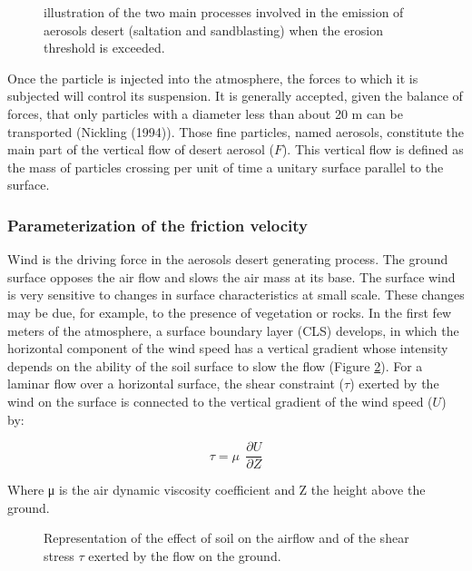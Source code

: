 \begin{figure}[h]
\begin{center}
\caption{illustration of the two main processes involved in the emission of aerosols desert (saltation and sandblasting) when the
erosion threshold is exceeded. \label{fig_chap5_1}}
\end{center}
\end{figure}

Once the particle is injected into the atmosphere, the forces to which it is subjected will
control its suspension. It is generally accepted, given the balance of forces, that only
particles with a diameter less than about 20 \textmu m can be transported (Nickling (1994)\nocite{Nickling1974}). 
Those fine particles, named aerosols, constitute the main part of the vertical flow of
desert aerosol ($F$). This vertical flow is defined as the mass of particles crossing per unit of time
a unitary surface parallel to the surface.

\subsubsection{Parameterization of the friction velocity}
Wind is the driving force in the aerosols desert generating process. The
ground surface opposes the air flow and slows the air mass at its base. The surface wind
is very sensitive to changes in surface characteristics at small
scale. These changes may be due, for example, to the presence of vegetation or
rocks. In the first few meters of the atmosphere, a surface boundary layer (CLS)
develops, in which the horizontal component of the wind speed has a
vertical gradient whose intensity depends on the ability of the soil surface to slow the
flow (Figure \ref{fig_chap5_2}). For a laminar flow over a horizontal surface, the
shear constraint ($\tau$) exerted by the wind on the surface is connected to the vertical gradient
of the wind speed ($U$) by:

\begin{equation}
\tau = \mu~~\frac{\partial U}{\partial Z}
\end{equation}
	
Where μ is the air dynamic viscosity coefficient and Z the height above the ground.

\begin{figure}[h]
\begin{center}
\caption{Representation of the effect of soil on the airflow and of the shear stress $\tau$ 
exerted by the flow on the ground. \label{fig_chap5_2}}
\end{center}
\end{figure}


